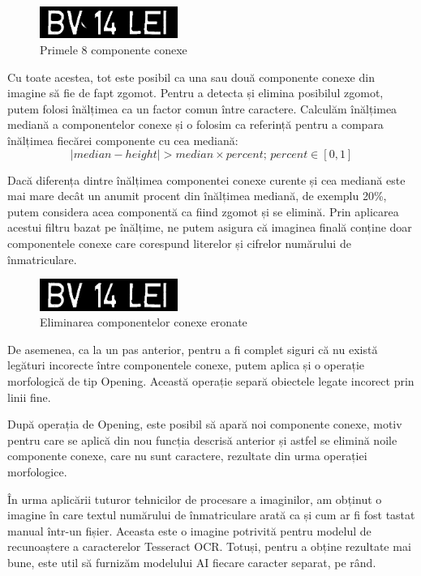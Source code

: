 \documentclass[a4paper,12pt]{report}
\begin{document}
\begin{figure}[h!]
    \centering
    \includegraphics[width=0.4\textwidth]{images/before_denoise.jpg}
    \caption{Primele 8 componente conexe}
\end{figure}
\FloatBarrier

Cu toate acestea, tot este posibil ca una sau două componente conexe din imagine să fie de fapt zgomot. Pentru a detecta și elimina posibilul zgomot, putem folosi înălțimea ca un factor comun între caractere. Calculăm înălțimea mediană a componentelor conexe și o folosim ca referință pentru a compara înălțimea fiecărei componente cu cea mediană:
\[
    \left| median - height \right| > median \times percent; \, percent \in [0, 1]
\]

Dacă diferența dintre înălțimea componentei conexe curente și cea mediană este mai mare decât un anumit procent din înălțimea mediană, de exemplu 20\%, putem considera acea componentă ca fiind zgomot și se elimină. Prin aplicarea acestui filtru bazat pe înălțime, ne putem asigura că imaginea finală conține doar componentele conexe care corespund literelor și cifrelor numărului de înmatriculare.

\begin{figure}[h!]
    \centering
    \includegraphics[width=0.4\textwidth]{images/after_denoise.jpg}
    \caption{Eliminarea componentelor conexe eronate}
\end{figure}
\FloatBarrier

De asemenea, ca la un pas anterior, pentru a fi complet siguri că nu există legături incorecte între componentele conexe, putem aplica și o operație morfologică de tip Opening. Această operație separă obiectele legate incorect prin linii fine.

După operația de Opening, este posibil să apară noi componente conexe, motiv pentru care se aplică din nou funcția descrisă anterior și astfel se elimină noile componente conexe, care nu sunt caractere, rezultate din urma operației morfologice.

În urma aplicării tuturor tehnicilor de procesare a imaginilor, am obținut o imagine în care textul numărului de înmatriculare arată ca și cum ar fi fost tastat manual într-un fișier. Aceasta este o imagine potrivită pentru modelul de recunoaștere a caracterelor Tesseract OCR. Totuși, pentru a obține rezultate mai bune, este util să furnizăm modelului AI fiecare caracter separat, pe rând.
\end{document}
